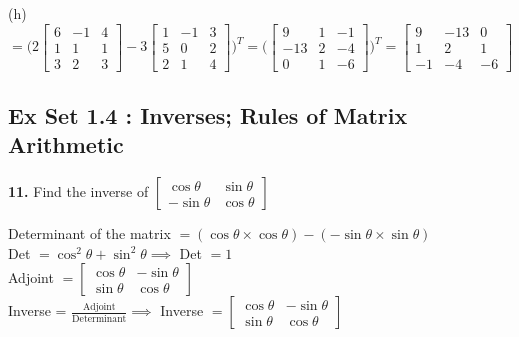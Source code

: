 \documentclass[addpoints]{exam}
\begin{document}
\begin{sloppypar}
\begin{questions}
\begin{solution}
        (h) $ = \Biggl( 2\begin{bmatrix}
            6 & -1 & 4 \\ 1 & 1 & 1 \\ 3 & 2 & 3
        \end{bmatrix} - 3\begin{bmatrix}
            1 & -1 & 3 \\ 5 & 0 & 2 \\ 2 & 1 & 4
        \end{bmatrix} \Biggr)^T = \Biggl( \begin{bmatrix}
            9 & 1 & -1 \\ 
            -13 & 2 & -4 \\ 
            0 & 1 & -6
        \end{bmatrix} \Biggr)^T = \begin{bmatrix}
            9 & -13 & 0 \\ 1 & 2 & 1 \\ -1 & -4 & -6
        \end{bmatrix} $

    \end{solution}
\end{questions}


\subsection*{\textbf{Ex Set 1.4 : Inverses; Rules of Matrix Arithmetic}}
\begin{questions}
    \question
    \textbf{11. } Find the inverse of $ \begin{bmatrix}
        \cos\theta & \sin\theta \\ 
        -\sin\theta & \cos\theta
    \end{bmatrix} $
    \begin{solution}
        Determinant of the matrix $ = (\cos\theta \times \cos\theta) - (-\sin\theta \times \sin\theta)$ \\ 
        Det $ = \cos^2\theta + \sin^2\theta \implies $ Det $ = 1 $ \\ 
        Adjoint $ = \begin{bmatrix}
            \cos\theta & -\sin\theta \\ 
            \sin\theta & \cos\theta
        \end{bmatrix} $ \\  
        Inverse = $ \frac{\text{Adjoint}}{\text{Determinant}} \implies $ Inverse $ = \begin{bmatrix}
            \cos\theta & -\sin\theta \\ 
            \sin\theta & \cos\theta
        \end{bmatrix} $
    \end{solution}


\end{questions}
\end{sloppypar}
\end{document}
